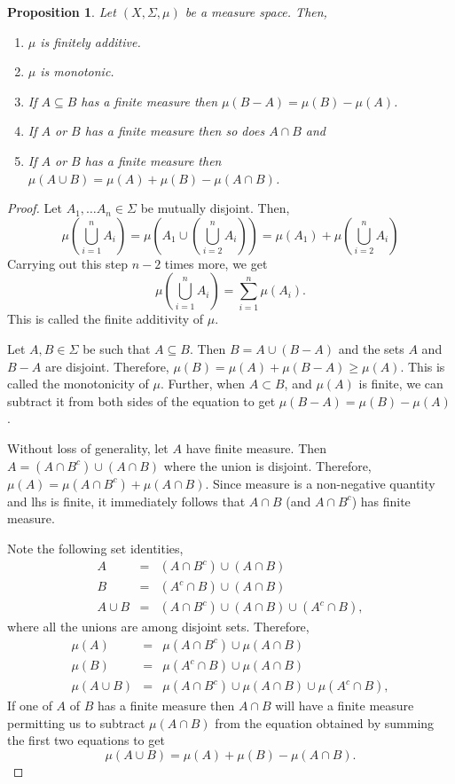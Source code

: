 \documentclass{article}
\theoremstyle{plain}
\numberwithin{thm}{section}
\theoremstyle{plain}
\newtheorem{prop}{Proposition}
\numberwithin{prop}{section}
\theoremstyle{definition}
\numberwithin{defn}{section}
\theoremstyle{remark}
\theoremstyle{plain}
\numberwithin{cor}{section}
\numberwithin{equation}{section}
\begin{document}
\begin{prop}\label{s1p4}Let $(X, \Sigma, \mu)$ be a measure space. Then,
\begin{enumerate}
\item $\mu$ is finitely additive.
\item $\mu$ is monotonic.
\item If $A \subseteq B$ has a finite measure then $\mu(B - A) = \mu(B) - \mu(A)$.
\item If $A$ or $B$ has a finite measure then so does $A \cap B$ and
\item If $A$ or $B$ has a finite measure then $\mu(A \cup B) = \mu(A) + \mu(B) -
\mu(A \cap B)$.
\end{enumerate}
\end{prop}
\begin{proof}
Let $A_1, \ldots A_n \in \Sigma$ be mutually disjoint. Then, 
\[
\mu\left(\bigcup_{i=1}^n A_i\right) = 
\mu\left( A_1 \cup \left(\bigcup_{i=2}^n A_i\right)\right) = 
\mu(A_1) + \mu\left(\bigcup_{i=2}^n A_i\right)
\]
Carrying out this step $n - 2$ times more, we get
\[
\mu\left(\bigcup_{i=1}^n A_i\right) = \sum_{i=1}^n \mu(A_i).
\]
This is called the finite additivity of $\mu$.

Let $A, B \in \Sigma$ be such that $A \subseteq B$. Then $B = A \cup (B - A)$
and the sets $A$ and $B - A$ are disjoint. Therefore, $\mu(B) = \mu(A) + 
\mu(B - A) \ge \mu(A)$.
This is called the monotonicity of $\mu$. Further, when $A \subset B$, and 
$\mu(A)$ is finite, we can subtract it from both sides of the equation to get
$\mu(B - A) = \mu(B) - \mu(A)$.

Without loss of generality, let $A$ have finite measure. Then $A = (A \cap B^c)
\cup (A \cap B)$ where the union is disjoint. Therefore, $\mu(A) = \mu(A \cap B^c)
+ \mu(A \cap B)$. Since measure is a non-negative quantity and lhs is finite, it
immediately follows that $A \cap B$ (and $A \cap B^c$) has finite measure.

Note the following set identities,
\begin{eqnarray*}
A &=& (A \cap B^c) \cup (A \cap B) \\
B &=& (A^c \cap B) \cup (A \cap B) \\
A \cup B &=& (A \cap B^c) \cup (A \cap B) \cup (A^c \cap B),
\end{eqnarray*}
where all the unions are among disjoint sets. Therefore,
\begin{eqnarray*}
\mu(A) &=& \mu(A \cap B^c) \cup \mu(A \cap B) \\
\mu(B) &=& \mu(A^c \cap B) \cup \mu(A \cap B) \\
\mu(A \cup B) &=& \mu(A \cap B^c) \cup \mu(A \cap B) \cup \mu(A^c \cap B),
\end{eqnarray*}
If one of $A$ of $B$ has a finite measure then $A \cap B$ will have a finite
measure permitting us to subtract $\mu(A \cap B)$ from the equation obtained
by summing the first two equations to get
\[
\mu(A \cup B) = \mu(A) + \mu(B) - \mu(A \cap B).
\]
\end{proof}
\end{document}
